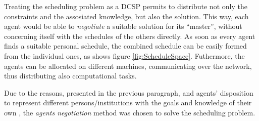 Treating the scheduling problem as a DCSP permits to
distribute not only the constraints and the assosiated knowledge, but also the solution.
This way, each agent would be able to \emph{negotiate} a suitable solution for its
``master'', without concerning itself with the schedules of the others directly.
As soon as every agent finds a suitable personal schedule, the
combined schedule can be easily formed from the individual ones, as shows
figure \ref{fig:ScheduleSpace}. Futhermore, the agents can be allocated on
different machines, communicating over the network, thus distributing also
computational tasks.

\medskip
Due to the reasons, presented in the previous paragraph, and agents'
disposition to represent different persons/institutions with the goals and knowledge
of their own \cite[p.~3]{MASSurvey}, the \emph{agents negotiation} method
was chosen to solve the scheduling problem.
